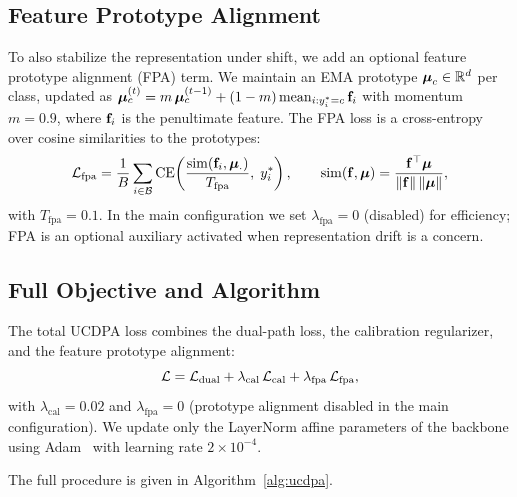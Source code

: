 \subsection{Feature Prototype Alignment}
\label{sec:method:fpa}

To also stabilize the representation under shift, we add an optional feature prototype alignment (FPA) term. We maintain an EMA prototype $\boldsymbol{\mu}_c \in \mathbb{R}^d$ per class, updated as $\boldsymbol{\mu}_c^{(t)} = m\, \boldsymbol{\mu}_c^{(t-1)} + (1-m)\, \mathrm{mean}_{i:y_i^*=c}\,\mathbf{f}_i$ with momentum $m = 0.9$, where $\mathbf{f}_i$ is the penultimate feature. The FPA loss is a cross-entropy over cosine similarities to the prototypes:
\begin{equation}
  \mathcal{L}_\mathrm{fpa} = \frac{1}{B} \sum_{i \in \mathcal{B}} \mathrm{CE}\!\left( \frac{\mathrm{sim}(\mathbf{f}_i, \boldsymbol{\mu}_\cdot)}{T_\mathrm{fpa}},\; y_i^* \right), \qquad \mathrm{sim}(\mathbf{f}, \boldsymbol{\mu}) = \frac{\mathbf{f}^\top \boldsymbol{\mu}}{\|\mathbf{f}\|\,\|\boldsymbol{\mu}\|},
  \label{eq:fpa-loss}
\end{equation}
with $T_\mathrm{fpa}=0.1$. In the main configuration we set $\lambda_\mathrm{fpa}=0$ (disabled) for efficiency; FPA is an optional auxiliary activated when representation drift is a concern.

\subsection{Full Objective and Algorithm}
\label{sec:method:algo}

The total UCDPA loss combines the dual-path loss, the calibration regularizer, and the feature prototype alignment:
\begin{equation}
  \mathcal{L} = \mathcal{L}_\mathrm{dual} + \lambda_\mathrm{cal}\, \mathcal{L}_\mathrm{cal} + \lambda_\mathrm{fpa}\, \mathcal{L}_\mathrm{fpa},
  \label{eq:total-loss}
\end{equation}
with $\lambda_\mathrm{cal} = 0.02$ and $\lambda_\mathrm{fpa} = 0$ (prototype alignment disabled in the main configuration). We update only the LayerNorm affine parameters of the backbone using Adam~\citep{kingma2015adam} with learning rate $2 \times 10^{-4}$.

The full procedure is given in Algorithm~\ref{alg:ucdpa}.

